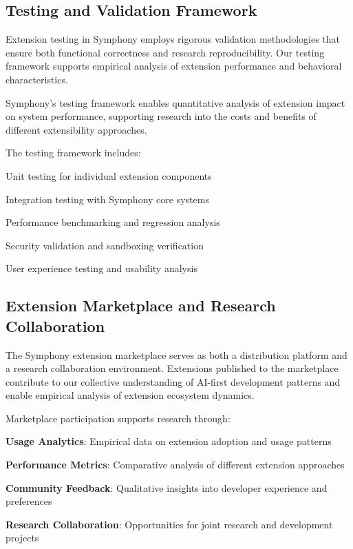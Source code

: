 \subsection*{Testing and Validation Framework}

Extension testing in Symphony employs rigorous validation methodologies that ensure both functional correctness and research reproducibility. Our testing framework supports empirical analysis of extension performance and behavioral characteristics.

\begin{successbox}
Symphony's testing framework enables quantitative analysis of extension impact on system performance, supporting research into the costs and benefits of different extensibility approaches.
\end{successbox}

The testing framework includes:
\begin{compactlist}
    \item Unit testing for individual extension components
    \item Integration testing with Symphony core systems
    \item Performance benchmarking and regression analysis
    \item Security validation and sandboxing verification
    \item User experience testing and usability analysis
\end{compactlist}

\subsection*{Extension Marketplace and Research Collaboration}

The Symphony extension marketplace serves as both a distribution platform and a research collaboration environment. Extensions published to the marketplace contribute to our collective understanding of AI-first development patterns and enable empirical analysis of extension ecosystem dynamics.

Marketplace participation supports research through:
\begin{expandedlist}
    \item \textbf{Usage Analytics}: Empirical data on extension adoption and usage patterns
    \item \textbf{Performance Metrics}: Comparative analysis of different extension approaches
    \item \textbf{Community Feedback}: Qualitative insights into developer experience and preferences
    \item \textbf{Research Collaboration}: Opportunities for joint research and development projects
\end{expandedlist}
